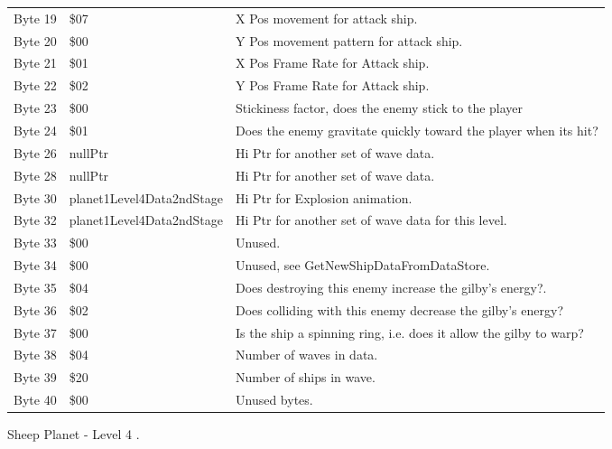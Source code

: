 \begin{figure}[H]
{\begin{adjustbox}{width=12cm}
\begin{tabular}{lll}
 Byte 19 & \$07                       & X Pos movement for attack ship.                                    \\
 Byte 20 & \$00                       & Y Pos movement pattern for attack ship.                            \\
 Byte 21 & \$01                       & X Pos Frame Rate for Attack ship.                                  \\
 Byte 22 & \$02                       & Y Pos Frame Rate for Attack ship.                                  \\
 Byte 23 & \$00                       & Stickiness factor, does the enemy stick to the player              \\
 Byte 24 & \$01                       & Does the enemy gravitate quickly toward the player when its hit?   \\
 Byte 26 & nullPtr                   & Hi Ptr for another set of wave data.                               \\
 Byte 28 & nullPtr                   & Hi Ptr for another set of wave data.                               \\
 Byte 30 & planet1Level4Data2ndStage & Hi Ptr for Explosion animation.                                    \\
 Byte 32 & planet1Level4Data2ndStage & Hi Ptr for another set of wave data for this level.                \\
 Byte 33 & \$00                       & Unused.                                                            \\
 Byte 34 & \$00                       & Unused, see GetNewShipDataFromDataStore.                           \\
 Byte 35 & \$04                       & Does destroying this enemy increase the gilby's energy?.           \\
 Byte 36 & \$02                       & Does colliding with this enemy decrease the gilby's energy?        \\
 Byte 37 & \$00                       & Is the ship a spinning ring, i.e. does it allow the gilby to warp? \\
 Byte 38 & \$04                       & Number of waves in data.                                           \\
 Byte 39 & \$20                       & Number of ships in wave.                                           \\
 Byte 40 & \$00                       & Unused bytes.                                                      \\
\bottomrule
\end{tabular}

  \end{adjustbox}

  }\caption*{Sheep Planet - Level 4
.}
\end{figure}

